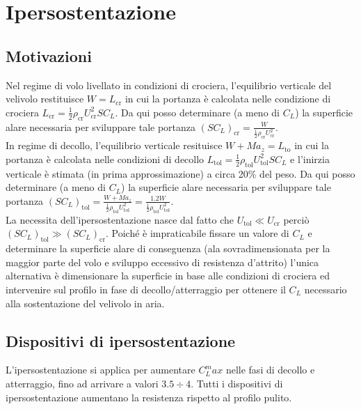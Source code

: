 \documentclass[11pt,a4paper]{report}
\begin{document}


\chapter{Ipersostentazione}
	\section{Motivazioni}
	Nel regime di volo livellato in condizioni di crociera, l'equilibrio verticale del velivolo restituisce $W=L_\mathrm{cr}$ in cui la portanza è calcolata nelle condizione di crociera $L_\mathrm{cr}=\frac 12\rho_\mathrm{cr}U_\mathrm{cr}^2SC_L$. Da qui posso determinare (a meno di $C_L$) la superficie alare necessaria per sviluppare tale portanza $(SC_L)_\mathrm{cr}=\frac{W}{\frac 12\rho_\mathrm{cr}U_\mathrm{cr}^2}$.\\
	In regime di decollo, l'equilibrio verticale resituisce $W+Ma_z=L_\mathrm{to}$ in cui la portanza è calcolata nelle condizioni di decollo $L_\mathrm{tol}=\frac 12\rho_\mathrm{tol}U_\mathrm{tol}^2SC_L$ e l'inirzia verticale è stimata (in prima approssimazione) a circa 20\% del peso. Da qui posso determinare (a meno di $C_L$) la superficie alare necessaria per sviluppare tale portanza $(SC_L)_\mathrm{tol}=\frac{W+Ma_z}{\frac 12\rho_\mathrm{tol}U_\mathrm{tol}^2}=\frac{1.2W}{\frac 12\rho_\mathrm{tol}U_\mathrm{tol}^2}$.\\
	La necessita dell'ipersostentazione nasce dal fatto che $U_\mathrm{tol}\ll U_\mathrm{cr}$ perciò $(SC_L)_\mathrm{tol}\gg(SC_L)_\mathrm{cr}$. Poiché è impraticabile fissare un valore di $C_L$ e determinare la superficie alare di conseguenza (ala sovradimensionata per la maggior parte del volo e sviluppo eccessivo di resistenza d'attrito) l'unica alternativa è dimensionare la superficie in base alle condizioni di crociera ed intervenire sul profilo in fase di decollo/atterraggio per ottenere il $C_L$ necessario alla sostentazione del velivolo in aria.
	
	\section{Dispositivi di ipersostentazione}
	L'ipersostentazione si applica per aumentare $C_L^max$ nelle fasi di decollo e atterraggio, fino ad arrivare a valori $3.5\div 4$. Tutti i dispositivi di ipersostentazione aumentano la resistenza rispetto al profilo pulito.
\end{document}
